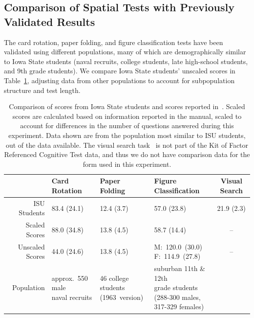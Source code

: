 \documentclass[11pt]{isuthesis}\usepackage[]{graphicx}\usepackage[]{color}
\begin{document}
\subsection{Comparison of Spatial Tests with Previously Validated Results}
The card rotation, paper folding, and figure classification tests have been validated using different populations, many of which are demographically similar to Iowa State students (naval recruits, college students, late high-school students, and 9th grade students). We compare Iowa State students' unscaled scores in Table~\ref{tab:scorecomparison}, adjusting data from other populations to account for subpopulation structure and test length. 

\begin{table}[htb]\centering
\caption[Comparison of scores for cognitive tasks with previously validated results]{Comparison of scores from Iowa State students and scores reported in~\protect\citep{ekstrom1976manual}. Scaled scores are calculated based on information reported in the manual, scaled to account for differences in the number of questions answered during this experiment. Data shown are from the population most similar to ISU students, out of the data available. The visual search task~\protect\citep{goldstein1973validity,demita1981validity,moerland1986neuropsychological} is not part of the Kit of Factor Referenced Cognitive Test data, and thus we do not have comparison data for the form used in this experiment.
\label{tab:scorecomparison}}
\begin{tabular}{rlllc}
\hline
  & Card Rotation & Paper Folding & Figure Classification & Visual Search  \\\hline
ISU Students & 83.4 (24.1) 
             & 12.4 (3.7)
             & 57.0 (23.8)\footnotemark[1]
             & 21.9 (2.3)\\
Scaled Scores & 88.0 (34.8)
              & 13.8 (4.5)
              & 58.7 (14.4)\footnotemark[2]
              & -- \\
Unscaled Scores & 44.0 (24.6)\footnotemark[3]
                & 13.8 (4.5)
                & \parbox[c]{.2\linewidth}{M:~120.0~(30.0)\\ F:~114.9~(27.8)}
                & --\\\hline
{\footnotesize Population}    
              & \parbox[t]{.15\linewidth}{\footnotesize approx.\ 550 male\\ naval recruits} 
              & \parbox[t]{.17\linewidth}{\footnotesize 46 college students\\(1963~version)}
              & \parbox[t]{.2\linewidth}{\footnotesize suburban 11th \& 12th \\ grade students\\(288-300 males, \\317-329 females)}
              & \\\hline
\end{tabular}
\end{table}
\end{document}
